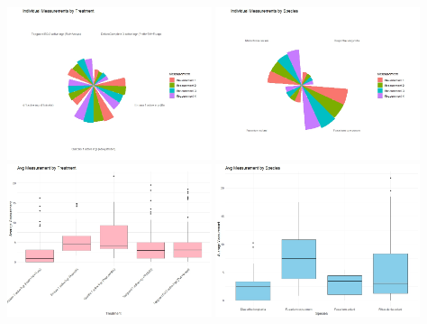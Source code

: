 \documentclass[
  10pt,
  letterpaper,
  twocolumn]{article}
\begin{document}
\clearpage
\nocite{*}

\includegraphics[width=0.45\textwidth,height=\textheight]{Fig1.jpeg}
\vspace{0.1cm}
\includegraphics[width=0.45\textwidth,height=\textheight]{Fig2.jpeg}
\vspace{0.1cm}
\includegraphics[width=0.45\textwidth,height=\textheight]{Fig5.jpeg}
\vspace{0.1cm}
\includegraphics[width=0.45\textwidth,height=\textheight]{Fig6.jpeg}
\vspace{0.1cm}
\end{document}
